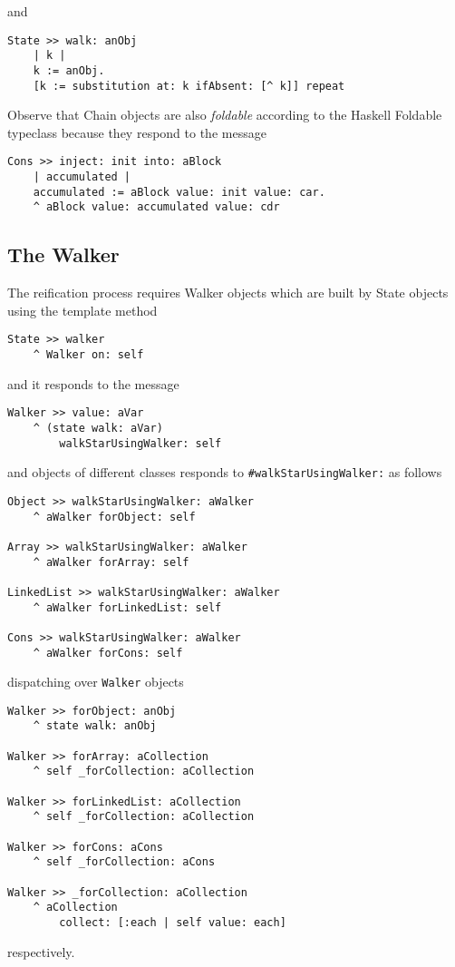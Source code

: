 \documentclass[a4paper,11pt]{article}
\newcommand{\ct}[1]{{\textsf{#1}}\xspace}
\begin{document}
and
\begin{verbatim}
State >> walk: anObj
    | k |
    k := anObj.
    [k := substitution at: k ifAbsent: [^ k]] repeat
\end{verbatim}
Observe that \ct{Chain} objects are also \textit{foldable} according to the
Haskell \ct{Foldable} typeclass because they respond to the message
\begin{verbatim}
Cons >> inject: init into: aBlock
    | accumulated |
    accumulated := aBlock value: init value: car.
    ^ aBlock value: accumulated value: cdr
\end{verbatim}

\subsection{The Walker}
The reification process requires \ct{Walker} objects which are built by
\ct{State} objects using the template method
\begin{verbatim}
State >> walker
    ^ Walker on: self
\end{verbatim}
and it responds to the message
\begin{verbatim}
Walker >> value: aVar
    ^ (state walk: aVar)
        walkStarUsingWalker: self
\end{verbatim}
and objects of different classes responds to \Verb|#walkStarUsingWalker:| as follows
\begin{verbatim}
Object >> walkStarUsingWalker: aWalker
    ^ aWalker forObject: self

Array >> walkStarUsingWalker: aWalker
    ^ aWalker forArray: self

LinkedList >> walkStarUsingWalker: aWalker
    ^ aWalker forLinkedList: self

Cons >> walkStarUsingWalker: aWalker
    ^ aWalker forCons: self
\end{verbatim}
dispatching over \Verb|Walker| objects
\begin{verbatim}
Walker >> forObject: anObj
    ^ state walk: anObj

Walker >> forArray: aCollection
    ^ self _forCollection: aCollection

Walker >> forLinkedList: aCollection
    ^ self _forCollection: aCollection

Walker >> forCons: aCons
    ^ self _forCollection: aCons

Walker >> _forCollection: aCollection
    ^ aCollection
        collect: [:each | self value: each]
\end{verbatim}
respectively.
\end{document}
